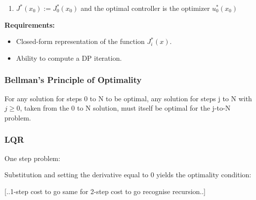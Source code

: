 \documentclass[8pt,a4paper]{scrartcl}
\begin{document}
\begin{multicols*}{3}
\begin{enumerate}
\item $J^\ast(x_0):=J_0^\ast(x_0)$ and the optimal controller is the optimizer $u_0^\ast(x_0)$
\end{enumerate}

\textbf{Requirements:}

\begin{itemize}
\ncompaq
\item Closed-form representation of the function $J_i^\ast(x)$.
\item Ability to compute a DP iteration.
\end{itemize}


\subsubsection{Bellman's Principle of Optimality}

For any solution for steps 0 to N to be optimal, any solution for steps j to N with $j\geq 0$, taken from the 0 to N solution, must itself be optimal for the j-to-N problem.


\subsubsection{LQR}

One step problem:



Substitution and setting the derivative equal to 0 yields the optimality condition:


[..1-step cost to go \dahe same for 2-step cost to go \dahe recognise recursion..]



\end{multicols*}
\end{document}
